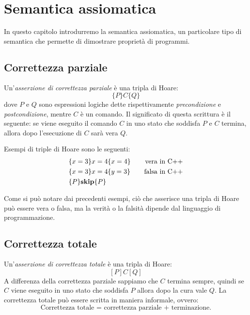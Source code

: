 \chapter{Semantica assiomatica}

In questo capitolo introdurremo la semantica assiomatica, un particolare
tipo di semantica che permette di dimostrare proprietà di programmi.

\section{Correttezza parziale}
\begin{definizione}
Un'\emph{asserzione di correttezza parziale} è una tripla di Hoare:
\[
  \{P\} C \{Q\}
\]
dove $P$ e $Q$ sono espressioni logiche dette 
rispettivamente \emph{precondizione} e \emph{postcondizione},
mentre $C$ è un comando. Il significato di questa scrittura è
il seguente: se viene eseguito il comando $C$ in uno stato che
soddisfa $P$ e $C$ termina, allora dopo l'esecuzione di $C$
sarà vera $Q$.
\end{definizione}

Esempi di triple di Hoare sono le seguenti:
\begin{align*}
\{ & x = 3 \} x = 4 \{ x = 4 \} & \text{\quad vera in C++}\\
\{ & x = 3 \} x = 4 \{ y = 3 \} & \text{\quad falsa in C++}\\
\{ & P \} \text{$\mathop{\textup{\textbf{skip}}}$} \{ P \}
\end{align*}

Come si può notare dai precedenti esempi, ciò che asserisce una
tripla di Hoare può essere vera o falsa, ma la verità o la falsità
dipende dal linguaggio di programmazione.

\section{Correttezza totale}
\begin{definizione}
Un'\emph{asserzione di correttezza totale} è una tripla di Hoare:
\[
  [P] C [Q]
\]
A differenza della correttezza parziale
sappiamo che $C$ termina sempre, quindi se $C$ viene eseguito in
uno stato che soddisfa $P$ allora dopo la cura vale $Q$. 
La correttezza totale può essere scritta in maniera informale, ovvero:
\[
   \text{Correttezza totale = correttezza parziale + terminazione.}
\]
\end{definizione}

